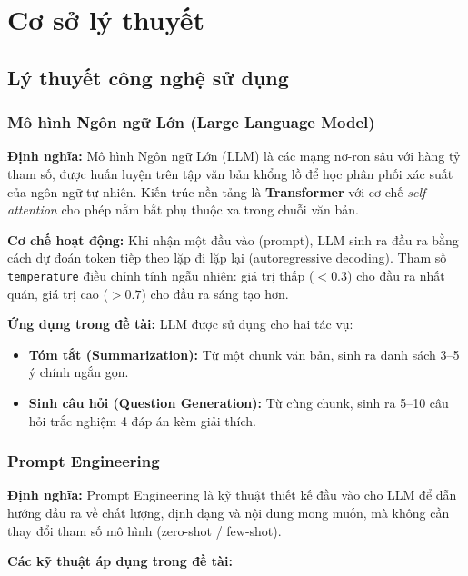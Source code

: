 \section{Cơ sở lý thuyết}

\subsection{Lý thuyết công nghệ sử dụng}

\subsubsection{Mô hình Ngôn ngữ Lớn (Large Language Model)}

\textbf{Định nghĩa:} Mô hình Ngôn ngữ Lớn (LLM) là các mạng nơ-ron sâu với
hàng tỷ tham số, được huấn luyện trên tập văn bản khổng lồ để học phân phối
xác suất của ngôn ngữ tự nhiên. Kiến trúc nền tảng là \textbf{Transformer}
\cite{vaswani2017attention} với cơ chế \textit{self-attention} cho phép nắm
bắt phụ thuộc xa trong chuỗi văn bản.

\textbf{Cơ chế hoạt động:} Khi nhận một đầu vào (prompt), LLM sinh ra đầu ra
bằng cách dự đoán token tiếp theo lặp đi lặp lại (autoregressive decoding).
Tham số \texttt{temperature} điều chỉnh tính ngẫu nhiên: giá trị thấp ($<0.3$)
cho đầu ra nhất quán, giá trị cao ($>0.7$) cho đầu ra sáng tạo hơn.

\textbf{Ứng dụng trong đề tài:} LLM được sử dụng cho hai tác vụ:
\begin{itemize}
    \item \textbf{Tóm tắt (Summarization):} Từ một chunk văn bản, sinh ra
          danh sách 3--5 ý chính ngắn gọn.
    \item \textbf{Sinh câu hỏi (Question Generation):} Từ cùng chunk, sinh
          ra 5--10 câu hỏi trắc nghiệm 4 đáp án kèm giải thích.
\end{itemize}

\subsubsection{Prompt Engineering}

\textbf{Định nghĩa:} Prompt Engineering là kỹ thuật thiết kế đầu vào cho LLM
để dẫn hướng đầu ra về chất lượng, định dạng và nội dung mong muốn, mà không
cần thay đổi tham số mô hình (zero-shot / few-shot).

\textbf{Các kỹ thuật áp dụng trong đề tài:}

